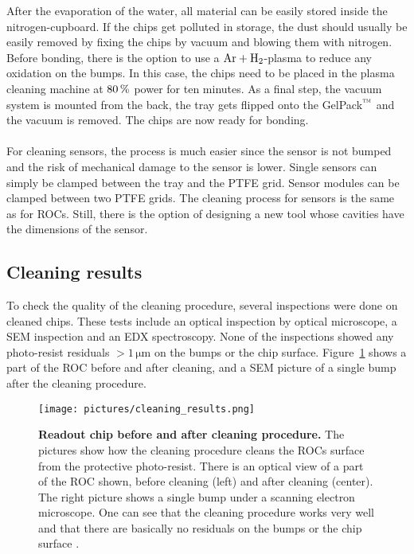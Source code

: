 After the evaporation of the water, all material can be easily stored inside the nitrogen-cupboard. If the chips get polluted in storage, the dust should usually be easily removed by fixing the chips by vacuum and blowing them with nitrogen. Before bonding, there is the option to use a $\rm{Ar}+\rm{H}_2$-plasma to reduce any oxidation on the bumps. In this case, the chips need to be placed in the plasma cleaning machine at $80\,\rm{\%}$ power for ten minutes. As a final step, the vacuum system is mounted from the back, the tray gets flipped onto the GelPack$\rm{\symbTM}$ and the vacuum is removed. The chips are now ready for bonding.\\
\\
For cleaning sensors, the process is much easier since the sensor is not bumped and the risk of mechanical damage to the sensor is lower. Single sensors can simply be clamped between the tray and the \ac{PTFE} grid. Sensor modules can be clamped between two \ac{PTFE} grids. The cleaning process for sensors is the same as for \ac{ROC}s. Still, there is the option of designing a new tool whose cavities have the dimensions of the sensor.



\subsection{Cleaning results}
To check the quality of the cleaning procedure, several inspections were done on cleaned chips. These tests include an optical inspection by optical microscope, a \ac{SEM} inspection and an \ac{EDX} spectroscopy. None of the inspections showed any photo-resist residuals $>1\,\si{\micro \meter}$ on the bumps or the chip surface. Figure~\ref{pic:cleaning_results} shows a part of the \acs{ROC} before and after cleaning, and a \ac{SEM} picture of a single bump after the cleaning procedure.
\begin{figure}
\begin{center}
\texttt{[image: pictures/cleaning\_results.png]}
\end{center}
\caption[Readout chip before and after the cleaning procedure.]{\textbf{Readout chip before and after cleaning procedure.} The pictures show how the cleaning procedure cleans the \acs{ROC}s surface from the protective photo-resist. There is an optical view of a part of the \acs{ROC} shown, before cleaning (left) and after cleaning (center). The right picture shows a single bump under a scanning electron microscope. One can see that the cleaning procedure works very well and that there are basically no residuals on the bumps or the chip surface \cite{Jun14}.}\label{pic:cleaning_results}
\end{figure}



